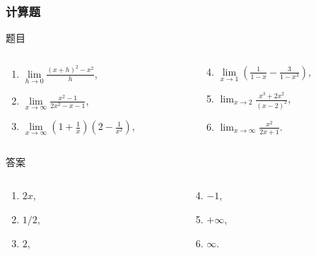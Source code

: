 \documentclass[
10pt,
aspectratio=43,
]{beamer}
\begin{document}
\begin{frame}
	\frametitle{计算题}

	\begin{block}{题目}
		\begin{columns}[onlytextwidth]
			\begin{column}{0.5\textwidth}
				\begin{enumerate}
					\item $\displaystyle\lim\limits_{h \to 0} \frac{(x+h)^2-x^2}{h}$,
					\item $\displaystyle\lim\limits_{x \to \infty} \frac{x^2-1}{2x^2-x-1}$,
					\item $\displaystyle\lim\limits_{x \to \infty}\left(1+\frac{1}{x}\right)\left(2-\frac{1}{x^2}\right)$,
				\end{enumerate}
			\end{column}
			\begin{column}{0.5\textwidth}
				\begin{enumerate}
					\setcounter{enumi}{3}
					\item $\displaystyle\lim\limits_{x \to 1}\left(\frac{1}{1-x}-\frac{3}{1-x^3}\right)$,
					\item $\displaystyle\lim _{x \rightarrow 2} \frac{x^3+2 x^2}{(x-2)^2}$,
					\item $\displaystyle\lim _{x \rightarrow \infty} \frac{x^2}{2 x+1}$.
				\end{enumerate}
			\end{column}
		\end{columns}
	\end{block}
	\pause
	\begin{exampleblock}{答案}
		\begin{columns}[onlytextwidth]
			\begin{column}{0.5\textwidth}
				\begin{enumerate}
					\item $2x$,
					      \pause
					\item $1/2$,
					      \pause
					\item $2$,
				\end{enumerate}
			\end{column}
			\begin{column}{0.5\textwidth}
				\begin{enumerate}
					\setcounter{enumi}{3}
					\pause
					\item $-1$,
					      \pause
					\item $+\infty$,
					      \pause
					\item $\infty$.
				\end{enumerate}
			\end{column}
		\end{columns}
	\end{exampleblock}

\end{frame}
\end{document}

